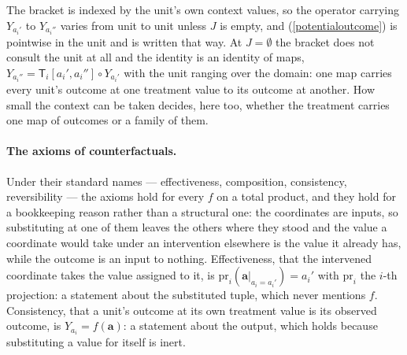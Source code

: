 \documentclass{article}
\theoremstyle{definition}
\theoremstyle{remark}
\begin{document}
\noindent The bracket is indexed by the unit's own context values, so the operator carrying $Y_{a_i'}$ to $Y_{a_i''}$ varies from unit to unit unless $J$ is empty, and (\ref{potentialoutcome}) is pointwise in the unit and is written that way. At $J = \emptyset$ the bracket does not consult the unit at all and the identity is an identity of maps, $Y_{a_i''} = \mathsf{T}_i[a_i', a_i''] \circ Y_{a_i'}$ with the unit ranging over the domain: one map carries every unit's outcome at one treatment value to its outcome at another. How small the context can be taken decides, here too, whether the treatment carries one map of outcomes or a family of them.

\paragraph{The axioms of counterfactuals.} Under their standard names --- effectiveness, composition, consistency, reversibility --- the axioms hold for every $f$ on a total product, and they hold for a bookkeeping reason rather than a structural one: the coordinates are inputs, so substituting at one of them leaves the others where they stood and the value a coordinate would take under an intervention elsewhere is the value it already has, while the outcome is an input to nothing. Effectiveness, that the intervened coordinate takes the value assigned to it, is $\mathrm{pr}_i(\boldsymbol{a}|_{a_i = a_i'}) = a_i'$ with $\mathrm{pr}_i$ the $i$-th projection: a statement about the substituted tuple, which never mentions $f$. Consistency, that a unit's outcome at its own treatment value is its observed outcome, is $Y_{a_i} = f(\boldsymbol{a})$: a statement about the output, which holds because substituting a value for itself is inert.
\end{document}
